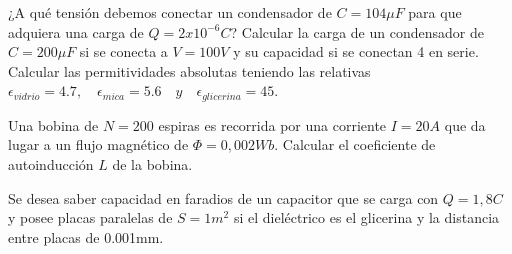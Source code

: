 \documentclass[./examen.tex]{subfiles}
\begin{document}
\begin{center}
\end{center}

\begin{questions}
\question ¿A qué tensión debemos conectar un condensador de $C=104\mu F$ para que adquiera una carga de $Q=2x10^{-6}C$?
\question Calcular la carga de un condensador de $C=200\mu F$ si se conecta a $V=100V$ y su capacidad si se conectan 4 en serie.
       \question Calcular las permitividades absolutas teniendo las relativas $\epsilon_{vidrio}=4.7,\quad \epsilon_{mica}=5.6\quad y\quad  \epsilon_{glicerina}=45.$
       
       
    \question Una bobina de $N=200$ espiras es recorrida por una corriente $I=20A$ que da lugar a un flujo magnético de $\Phi=0,002Wb$. Calcular el coeficiente de autoinducción $L$ de la bobina.

     \question Se desea saber capacidad en faradios de un capacitor que se carga con $Q=1,8C$ y posee placas paralelas de $S=1m^2$ si el dieléctrico es el glicerina y la distancia entre placas de 0.001mm.
       
\end{questions}

 
\end{document}
